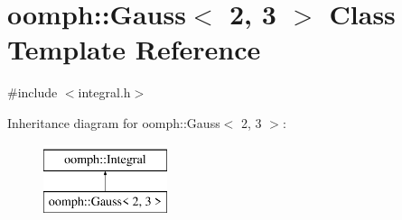 \hypertarget{classoomph_1_1Gauss_3_012_00_013_01_4}{}\section{oomph\+:\+:Gauss$<$ 2, 3 $>$ Class Template Reference}
\label{classoomph_1_1Gauss_3_012_00_013_01_4}


{\ttfamily \#include $<$integral.\+h$>$}

Inheritance diagram for oomph\+:\+:Gauss$<$ 2, 3 $>$\+:\begin{figure}[H]
\begin{center}
\leavevmode
\includegraphics[height=2.000000cm]{classoomph_1_1Gauss_3_012_00_013_01_4}
\end{center}
\end{figure}
